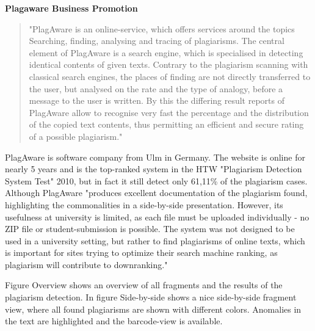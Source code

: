 \textbf{Plagaware Business Promotion}
\begin{quote}
"PlagAware is an online-service, which offers services around the topics Searching, finding, analysing and tracing of plagiarisms. The central element of PlagAware is a search engine, which is specialised in detecting identical contents of given texts. Contrary to the plagiarism scanning with classical search engines, the places of finding are not directly transferred to the user, but analysed on the rate and the type of analogy, before a message to the user is written. By this the differing result reports of PlagAware allow to recognise very fast the percentage and the distribution of the copied text contents, thus permitting an efficient and secure rating of a possible plagiarism."  
\end{quote}\citep{PlagawareTest}


PlagAware is software company from Ulm in Germany. The website is online for nearly 5 years and is the top-ranked system in the HTW "Plagiarism Detection System Test" 2010, but in fact it still detect only 61,11\% of the plagiarism cases. 
Although PlagAware "produces excellent documentation of the plagiarism found, highlighting the commonalities in a side-by-side presentation. However, its usefulness at university is limited, as each file must be uploaded individually - no ZIP file or student-submission is possible. The system was not designed to be used in a university setting, but rather to find plagiarisms of online texts, which is important for sites trying to optimize their search machine ranking, as plagiarism will contribute to downranking." \citep{PlagawareTest}

Figure Overview shows an overview of all fragments and the results of the plagiarism detection. In figure Side-by-side shows a nice side-by-side fragment view, where all found plagiarisms are shown with different colors. Anomalies in the text are highlighted and the barcode-view is available.
 
